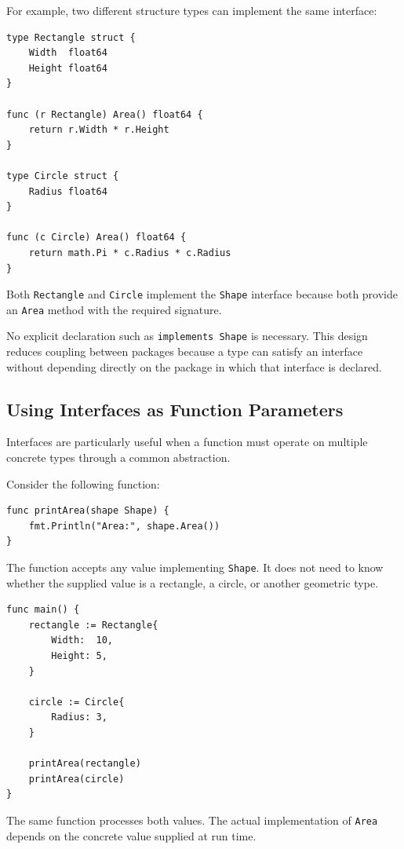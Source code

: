 For example, two different structure types can implement the same interface:

\begin{lstlisting}
type Rectangle struct {
    Width  float64
    Height float64
}

func (r Rectangle) Area() float64 {
    return r.Width * r.Height
}

type Circle struct {
    Radius float64
}

func (c Circle) Area() float64 {
    return math.Pi * c.Radius * c.Radius
}
\end{lstlisting}

Both \texttt{Rectangle} and \texttt{Circle} implement the \texttt{Shape} interface because both provide an \texttt{Area} method with the required signature.

No explicit declaration such as \texttt{implements Shape} is necessary. This design reduces coupling between packages because a type can satisfy an interface without depending directly on the package in which that interface is declared.

\subsection{Using Interfaces as Function Parameters}

Interfaces are particularly useful when a function must operate on multiple concrete types through a common abstraction.

Consider the following function:

\begin{lstlisting}
func printArea(shape Shape) {
    fmt.Println("Area:", shape.Area())
}
\end{lstlisting}

The function accepts any value implementing \texttt{Shape}. It does not need to know whether the supplied value is a rectangle, a circle, or another geometric type.

\begin{lstlisting}
func main() {
    rectangle := Rectangle{
        Width:  10,
        Height: 5,
    }

    circle := Circle{
        Radius: 3,
    }

    printArea(rectangle)
    printArea(circle)
}
\end{lstlisting}

The same function processes both values. The actual implementation of \texttt{Area} depends on the concrete value supplied at run time.

